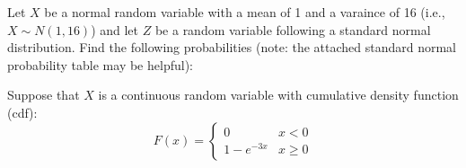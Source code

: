 \documentclass[addpoints]{examsetup}\usepackage[]{graphicx}\usepackage[]{color}
\newenvironment{knitrout}{}{} %
\begin{document}
\begin{questions}

\newpage

\question

Let $X$ be a normal random variable with a mean of 1 and a varaince of 16 (i.e., $X \sim N(1,16)$) and let $Z$ be a random variable following a standard normal distribution.
Find the following probabilities (note: the attached standard normal probability table may be helpful):

\question 

Suppose that $X$ is a continuous random variable with cumulative density function (cdf):
$$
F(x) = 
\begin{cases}
    0 &  x < 0 \\
   1 - e^{-3x} &  x \ge 0
\end{cases}
$$


\end{questions}
\end{document}
